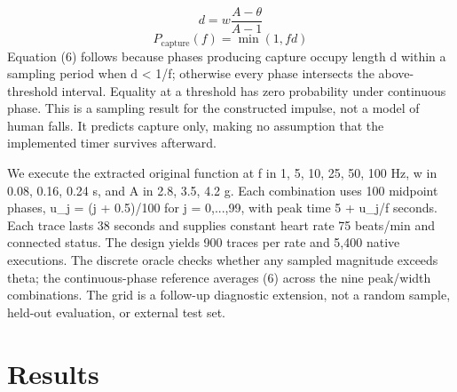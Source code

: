 \documentclass[journal]{IEEEtran}
\begin{document}
\begin{equation}d=w\frac{A-\theta}{A-1}\end{equation}
\begin{equation}P_{\mathrm{capture}}(f)=\min(1,fd)\end{equation}
Equation (6) follows because phases producing capture occupy length d within a sampling period when d < 1/f; otherwise every phase intersects the above-threshold interval. Equality at a threshold has zero probability under continuous phase. This is a sampling result for the constructed impulse, not a model of human falls. It predicts capture only, making no assumption that the implemented timer survives afterward.

We execute the extracted original function at f in {1, 5, 10, 25, 50, 100} Hz, w in {0.08, 0.16, 0.24} s, and A in {2.8, 3.5, 4.2} g. Each combination uses 100 midpoint phases, u\_j = (j + 0.5)/100 for j = 0,...,99, with peak time 5 + u\_j/f seconds. Each trace lasts 38 seconds and supplies constant heart rate 75 beats/min and connected status. The design yields 900 traces per rate and 5,400 native executions. The discrete oracle checks whether any sampled magnitude exceeds theta; the continuous-phase reference averages (6) across the nine peak/width combinations. The grid is a follow-up diagnostic extension, not a random sample, held-out evaluation, or external test set.

\section{Results}
\end{document}
